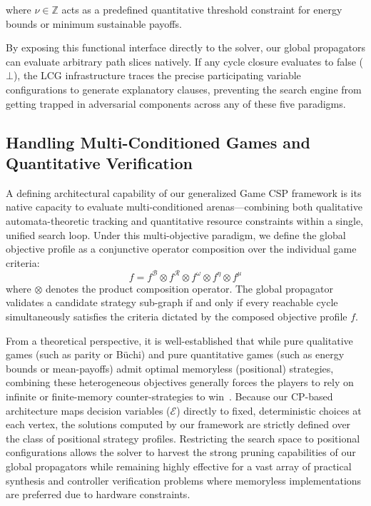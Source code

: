 \documentclass[a4paper,fleqn]{cas-sc}
\begin{document}
\noindent where $\nu \in \mathbb{Z}$ acts as a predefined quantitative threshold constraint for energy bounds or minimum sustainable payoffs. 

By exposing this functional interface directly to the solver, our global propagators \nooppc   can evaluate arbitrary path slices natively. If any cycle closure evaluates to false ($\bot$), the LCG infrastructure traces the precise participating variable configurations to generate explanatory clauses, preventing the search engine from getting trapped in adversarial components across any of these five paradigms.


\subsection{Handling Multi-Conditioned Games and Quantitative Verification}\label{sec:multi_conditioned}

A defining architectural capability of our generalized Game CSP framework is its native capacity to evaluate multi-conditioned arenas—combining both qualitative automata-theoretic tracking and quantitative resource constraints within a single, unified search loop. Under this multi-objective paradigm, we define the global objective profile as a conjunctive operator composition over the individual game criteria:
\[
f = f^{\mathcal{B}} \otimes f^{\mathcal{R}} \otimes f^{\omega} \otimes f^{\eta} \otimes f^{\mu} 
\]
where $\otimes$ denotes the product composition operator. The global propagator validates a candidate strategy sub-graph if and only if every reachable cycle simultaneously satisfies the criteria dictated by the composed objective profile $f$.

From a theoretical perspective, it is well-established that while pure qualitative games (such as parity or Büchi) and pure quantitative games (such as energy bounds or mean-payoffs) admit optimal memoryless (positional) strategies, combining these heterogeneous objectives generally forces the players to rely on infinite or finite-memory counter-strategies to win~\cite{ChatterjeeHJ05,Chatterjee:2010}. Because our CP-based architecture maps decision variables ($\mathcal{E}$) directly to fixed, deterministic choices at each vertex, the solutions computed by our framework are strictly defined over the class of positional strategy profiles. Restricting the search space to positional configurations allows the solver to harvest the strong pruning capabilities of our global propagators while remaining highly effective for a vast array of practical synthesis and controller verification problems where memoryless implementations are preferred due to hardware constraints.
\end{document}
